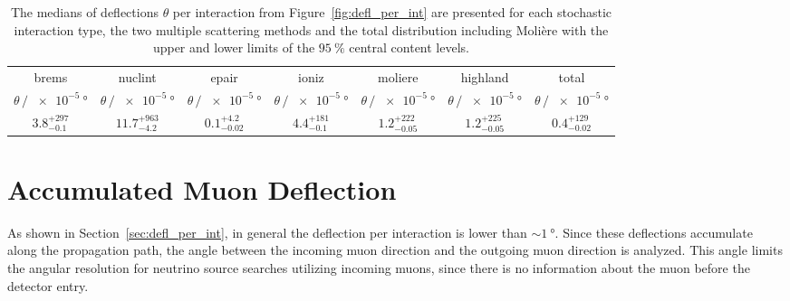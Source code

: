 \documentclass[pdflatex, sn-mathphys]{sn-jnl}%
\theoremstyle{thmstyleone}%
\theoremstyle{thmstyletwo}%
\theoremstyle{thmstylethree}%
\begin{document}
\begin{table}
    \centering 
    \caption{The medians of deflections $\theta$ per interaction from Figure~\ref{fig:defl_per_int} are presented for each stochastic interaction type, the two multiple scattering methods and the total distribution including Molière with the upper and lower limits of the $\SI{95}{\percent}$ 
    central content levels.}
    \begin{tabular}{ccccccc}
        \toprule 
        brems & nuclint & epair & ioniz & moliere & highland & total  \vspace{6pt} \\
        $\theta\,/\,\SI{e-5}{\degree}$ & $\theta\,/\,\SI{e-5}{\degree}$ & $\theta\,/\,\SI{e-5}{\degree}$ & $\theta\,/\,\SI{e-5}{\degree}$ & $\theta\,/\,\SI{e-5}{\degree}$ & $\theta\,/\,\SI{e-5}{\degree}$ & $\theta\,/\,\SI{e-5}{\degree}$\\
        \midrule 
        $3.8_{-0.1}^{+297}$ & $11.7_{-4.2}^{+963}$ & $0.1_{-0.02}^{+4.2}$ & $4.4_{-0.1}^{+181}$& $1.2_{-0.05}^{+222}$ & $1.2_{-0.05}^{+225}$ & $0.4_{-0.02}^{+129}$\\ 

        \bottomrule
    \end{tabular}
    \label{tab:defl_per_int}
\end{table}

\section{Accumulated Muon Deflection}\label{sec:accum_defl}

As shown in Section~\ref{sec:defl_per_int}, in general the deflection per interaction 
is lower than $\sim\SI{1}{\degree}$. Since these deflections accumulate along the 
propagation path, the angle between the incoming muon direction and the outgoing 
muon direction is analyzed. This angle limits the angular resolution 
for neutrino source searches utilizing incoming muons, since there is no information 
about the muon before the detector entry.
\end{document}
